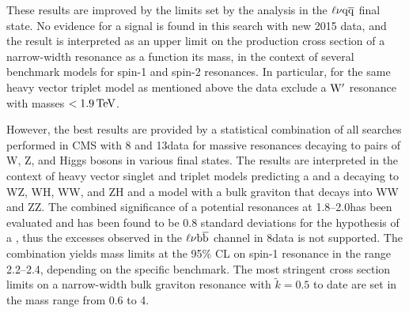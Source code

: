 These results are improved by the limits set by the analysis in the $\ell\nu\mathrm{q}\overline{\mathrm{q}}$ final state.
No evidence for a signal is found in this search with new 2015 data, and the result is interpreted as an upper limit on the production cross section of a narrow-width resonance as a function its mass,
in the context of several benchmark models for spin-1 and spin-2 resonances. In particular, for the same heavy vector triplet model as mentioned above the data exclude a $\mathrm{W}^\prime$ resonance with masses $< 1.9\,\text{Te\hspace{-.08em}V}$.

However, the best results are provided by a statistical combination of all searches performed in CMS with 8 and 13\TeV data for massive resonances decaying to pairs of W, Z, and Higgs bosons in various final states.
The results are interpreted in the context of heavy vector singlet and triplet models predicting a \Wpr and a \Zpr decaying to WZ, WH, WW, and ZH and a model with a bulk graviton that decays into WW and ZZ.
The combined significance of a potential resonances at 1.8--2.0\TeV has been evaluated and has been found to be 0.8 standard deviations for the hypothesis of a \Wpr,
thus the excesses observed in the $\ell\nu{\mathrm{b}\overline{\mathrm{b}}}$ channel in 8\TeV data is not supported.
The combination yields mass limits at the 95\% CL on spin-1 resonance in the range 2.2--2.4\TeV, depending on the specific benchmark.
The most stringent cross section limits on a narrow-width bulk graviton resonance with $\tilde{k} = 0.5$ to date are set in the mass range from 0.6 to 4\TeV.
